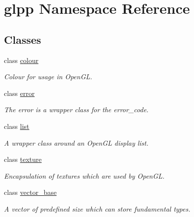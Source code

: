 \hypertarget{namespaceglpp}{}\section{glpp Namespace Reference}
\label{namespaceglpp}
\subsection*{Classes}
\begin{DoxyCompactItemize}
\item 
class \hyperlink{classglpp_1_1colour}{colour}
\begin{DoxyCompactList}\small\item\em Colour for usage in Open\+GL. \end{DoxyCompactList}\item 
class \hyperlink{classglpp_1_1error}{error}
\begin{DoxyCompactList}\small\item\em The error is a wrapper class for the error\+\_\+code. \end{DoxyCompactList}\item 
class \hyperlink{classglpp_1_1list}{list}
\begin{DoxyCompactList}\small\item\em A wrapper class around an Open\+GL display list. \end{DoxyCompactList}\item 
class \hyperlink{classglpp_1_1texture}{texture}
\begin{DoxyCompactList}\small\item\em Encapsulation of textures which are used by Open\+GL. \end{DoxyCompactList}\item 
class \hyperlink{classglpp_1_1vector__base}{vector\+\_\+base}
\begin{DoxyCompactList}\small\item\em A vector of predefined size which can store fundamental types. \end{DoxyCompactList}\end{DoxyCompactItemize}
